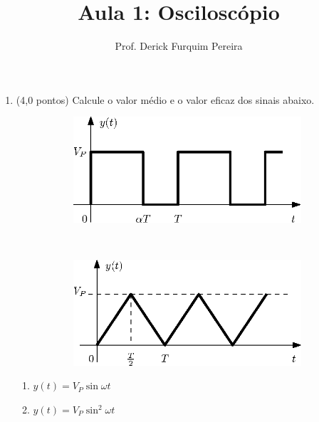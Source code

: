 \documentclass[11pt]{article} %
\title{Aula 1: Osciloscópio}
\author{Prof. Derick Furquim Pereira}
\date{} %
\begin{document}
\maketitle
\thispagestyle{fancy}

\begin{enumerate}

\item (4,0 pontos) Calcule o valor médio e o valor eficaz dos sinais abaixo.

\begin{figure}[!h]
    \centering
    \begin{subfigure}[b]{0.45\textwidth}
        \includegraphics[width=\textwidth]{square.eps}
        \caption{}
    \end{subfigure}
    ~
    \begin{subfigure}[b]{0.45\textwidth}
        \includegraphics[width=\textwidth]{triangle.eps}
        \caption{}
    \end{subfigure}
\end{figure}

\begin{multicols}{2}
\begin{enumerate}[start=3]
\centering
\item $y(t)=V_P\sin{\omega t}$
\item $y(t)=V_P\sin^2{\omega t}$
\end{enumerate}
\end{multicols}


\end{enumerate}
\end{document}
